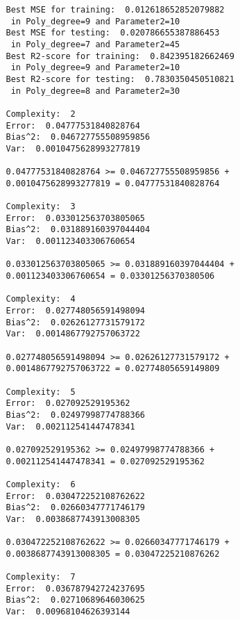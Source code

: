 \begin{verbatim}
                Best MSE for training:  0.012618652852079882 
                 in Poly_degree=9 and Parameter2=10
                Best MSE for testing:  0.020786655387886453 
                 in Poly_degree=7 and Parameter2=45
                Best R2-score for training:  0.842395182662469 
                 in Poly_degree=9 and Parameter2=10
                Best R2-score for testing:  0.7830350450510821 
                 in Poly_degree=8 and Parameter2=30
                 
                Complexity:  2
                Error:  0.04777531840828764
                Bias^2:  0.046727755508959856
                Var:  0.0010475628993277819
                
                0.04777531840828764 >= 0.046727755508959856 + 
                0.0010475628993277819 = 0.04777531840828764
                
                Complexity:  3
                Error:  0.033012563703805065
                Bias^2:  0.031889160397044404
                Var:  0.001123403306760654
                
                0.033012563703805065 >= 0.031889160397044404 + 
                0.001123403306760654 = 0.03301256370380506
                
                Complexity:  4
                Error:  0.027748056591498094
                Bias^2:  0.02626127731579172
                Var:  0.0014867792757063722
                
                0.027748056591498094 >= 0.02626127731579172 +
                0.0014867792757063722 = 0.02774805659149809
                
                Complexity:  5
                Error:  0.027092529195362
                Bias^2:  0.02497998774788366
                Var:  0.002112541447478341
                
                0.027092529195362 >= 0.02497998774788366 + 
                0.002112541447478341 = 0.027092529195362
                
                Complexity:  6
                Error:  0.030472252108762622
                Bias^2:  0.02660347771746179
                Var:  0.0038687743913008305
                
                0.030472252108762622 >= 0.02660347771746179 +
                0.0038687743913008305 = 0.03047225210876262
                
                Complexity:  7
                Error:  0.036787942724237695
                Bias^2:  0.02710689646030625
                Var:  0.00968104626393144
                

\end{verbatim}
